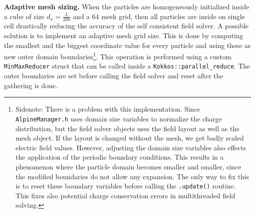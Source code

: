 \textbf{Adaptive mesh sizing.} When the particles are homogeneously initialized inside a cube of size $d_x = \frac{L}{200}$ and a $64$ mesh grid, then all particles are inside on single cell drastically reducing the accuracy of the self consistent field solver. A possible solution is to implement an adaptive mesh grid size. This is done by computing the smallest and the biggest coordinate value for every particle and using these as new outer domain boundaries\footnote{Sidenote: There is a problem with this implementation. Since \texttt{AlpineManager.h} uses domain size variables to normalize the charge distribution, but the field solver objects uses the field layout as well as the mesh object. If the layout is changed without the mesh, we get badly scaled electric field values. However, adjusting the domain size variables also effects the application of the periodic boundary conditions. This results in a phenomenon where the particle domain becomes smaller and smaller, since the modified boundaries do not allow any expansion. The only way to fix this is to reset these boundary variables before calling the \texttt{.update()} routine. This fixes also potential charge conservation errors in multithreaded field solving.}. This operation is performed using a custom \texttt{MinMaxReducer} struct that can be called inside a \texttt{Kokkos::parallel\_reduce}. The outer boundaries are set before calling the field solver and reset after the gathering is done. 

